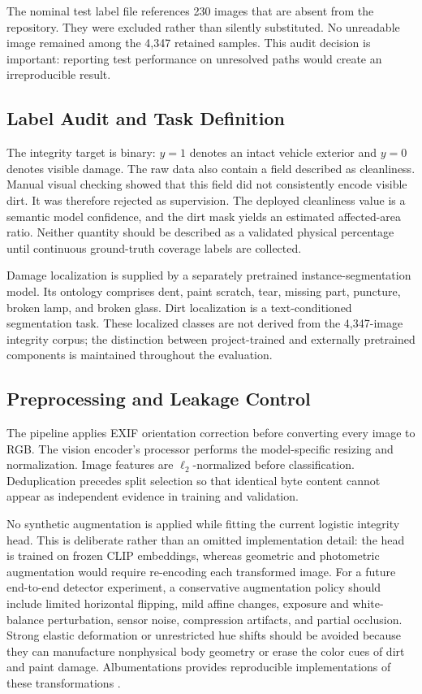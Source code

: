 \documentclass[conference]{IEEEtran}
\begin{document}
The nominal test label file references 230 images that are absent from the repository. They were excluded rather than silently substituted. No unreadable image remained among the 4,347 retained samples. This audit decision is important: reporting test performance on unresolved paths would create an irreproducible result.

\subsection{Label Audit and Task Definition}

The integrity target is binary: $y=1$ denotes an intact vehicle exterior and $y=0$ denotes visible damage. The raw data also contain a field described as cleanliness. Manual visual checking showed that this field did not consistently encode visible dirt. It was therefore rejected as supervision. The deployed cleanliness value is a semantic model confidence, and the dirt mask yields an estimated affected-area ratio. Neither quantity should be described as a validated physical percentage until continuous ground-truth coverage labels are collected.

Damage localization is supplied by a separately pretrained instance-segmentation model. Its ontology comprises dent, paint scratch, tear, missing part, puncture, broken lamp, and broken glass. Dirt localization is a text-conditioned segmentation task. These localized classes are not derived from the 4,347-image integrity corpus; the distinction between project-trained and externally pretrained components is maintained throughout the evaluation.

\subsection{Preprocessing and Leakage Control}

The pipeline applies EXIF orientation correction before converting every image to RGB. The vision encoder's processor performs the model-specific resizing and normalization. Image features are $\ell_2$-normalized before classification. Deduplication precedes split selection so that identical byte content cannot appear as independent evidence in training and validation.

No synthetic augmentation is applied while fitting the current logistic integrity head. This is deliberate rather than an omitted implementation detail: the head is trained on frozen CLIP embeddings, whereas geometric and photometric augmentation would require re-encoding each transformed image. For a future end-to-end detector experiment, a conservative augmentation policy should include limited horizontal flipping, mild affine changes, exposure and white-balance perturbation, sensor noise, compression artifacts, and partial occlusion. Strong elastic deformation or unrestricted hue shifts should be avoided because they can manufacture nonphysical body geometry or erase the color cues of dirt and paint damage. Albumentations provides reproducible implementations of these transformations \cite{buslaev2020}.
\end{document}
